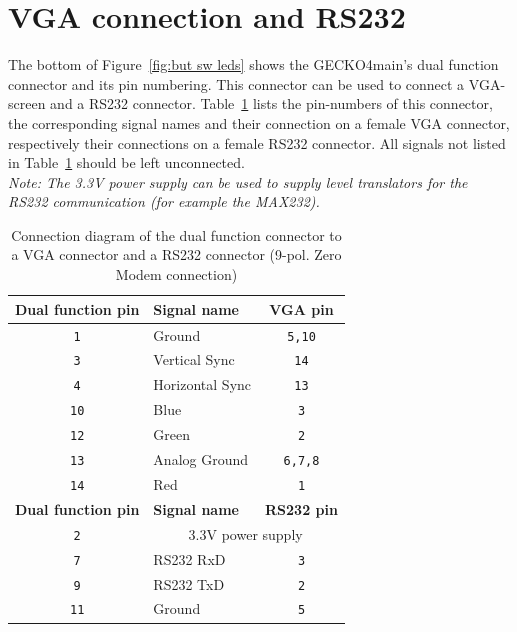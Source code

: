 \section{VGA connection and RS232}
The bottom of Figure~\ref{fig:but sw leds} shows the {\sc GECKO4main}'s dual function connector and
its pin numbering.
This connector can be used to connect a VGA-screen and a
RS232 connector. Table~\ref{tab: conn vga rs232} lists the pin-numbers of this connector, the
corresponding signal names and their connection on a female VGA connector,
respectively their connections on a female RS232 connector. All signals not
listed in Table~\ref{tab: conn vga rs232} should be left unconnected.\\
\textit{Note: The 3.3V power supply can be used to supply level translators for
the RS232 communication (for example the MAX232).\note}
\begin{table}[h]
\centering%
\begin{tabular}{|c|l|c|}
\hline
\textbf{Dual function pin}&\textbf{Signal name}&\textbf{VGA pin}\\
\hline
\hline
\verb+1+&Ground&\verb+5,10+\\
\hline
\verb+3+&Vertical Sync&\verb+14+\\
\hline
\verb+4+&Horizontal Sync&\verb+13+\\
\hline
\verb+10+&Blue&\verb+3+\\
\hline
\verb+12+&Green&\verb+2+\\
\hline
\verb+13+&Analog Ground&\verb+6,7,8+\\
\hline
\verb+14+&Red&\verb+1+\\
\hline
\hline
\textbf{Dual function pin}&\textbf{Signal name}&\textbf{RS232 pin}\\
\hline
\hline
\verb+2+&\multicolumn{2}{c|}{3.3V power supply}\\
\hline
\verb+7+&RS232 RxD&\verb+3+\\
\hline
\verb+9+&RS232 TxD&\verb+2+\\
\hline
\verb+11+&Ground&\verb+5+\\
\hline
\end{tabular}
\caption{Connection diagram of the dual function connector to a VGA connector
and a RS232 connector (9-pol. Zero Modem connection)}
\label{tab: conn vga rs232}
\end{table}
